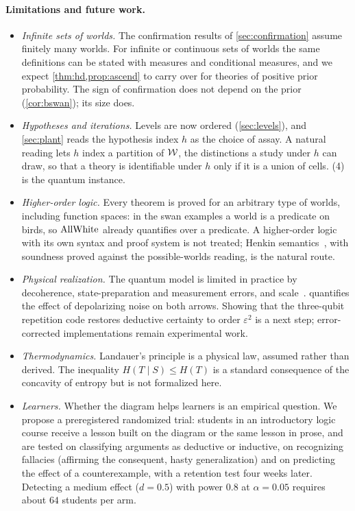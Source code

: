 \paragraph{Limitations and future work.}
\begin{itemize}
  \item \emph{Infinite sets of worlds.} The confirmation results of \cref{sec:confirmation} assume
        finitely many worlds. For infinite or continuous sets of worlds the same definitions can be
        stated with measures and conditional measures, and we expect
        \cref{thm:hd,prop:ascend} to carry over for theories of positive prior probability. The
        sign of confirmation does not depend on the prior (\cref{cor:bswan}); its size does.
  \item \emph{Hypotheses and iterations.} Levels are now ordered (\cref{sec:levels}), and
        \cref{sec:plant} reads the hypothesis index $h$ as the choice of assay. A natural reading lets $h$ index a partition of
        $\mathcal W$, the distinctions a study under $h$ can draw, so that a theory is identifiable under
        $h$ only if it is a union of cells. (4) is the quantum instance.
  \item \emph{Higher-order logic.} Every theorem is proved for an arbitrary type of worlds,
        including function spaces: in the swan examples a world is a predicate on birds, so $\mathrm{AllWhite}$
        already quantifies over a predicate. A higher-order logic with its own syntax and proof
        system is not treated; Henkin semantics~\cite{henkin}, with soundness proved against the
        possible-worlds reading, is the natural route.
  \item \emph{Physical realization.} The quantum model is limited in practice by decoherence,
        state-preparation and measurement errors, and scale~\cite{preskill,arute}.
         quantifies the effect of depolarizing noise on both arrows. Showing that
        the three-qubit repetition code restores deductive certainty to order $\varepsilon^2$ is a
        next step; error-corrected implementations remain experimental work.
  \item \emph{Thermodynamics.} Landauer's principle is a physical law, assumed rather than
        derived. The inequality $H(T\mid S)\le H(T)$ is a standard consequence of the concavity of
        entropy but is not formalized here.
  \item \emph{Learners.} Whether the diagram helps learners is an empirical question. We propose a
        preregistered randomized trial: students in an introductory logic course receive a lesson
        built on the diagram or the same lesson in prose, and are tested on classifying arguments
        as deductive or inductive, on recognizing fallacies (affirming the consequent, hasty
        generalization) and on predicting the effect of a counterexample, with a retention test
        four weeks later. Detecting a medium effect ($d=0.5$) with power $0.8$ at $\alpha=0.05$
        requires about $64$ students per arm.
\end{itemize}

